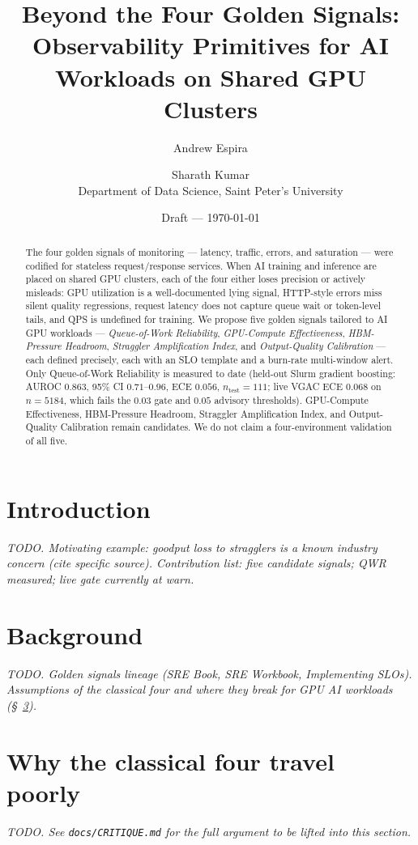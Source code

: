 \documentclass[11pt]{article}
\title{Beyond the Four Golden Signals:\\
Observability Primitives for AI Workloads on Shared GPU Clusters}
\author{Andrew Espira \and Sharath Kumar\\
Department of Data Science, Saint Peter's University}
\date{Draft --- \today}
\begin{document}
\maketitle

\begin{abstract}
The four golden signals of monitoring --- latency, traffic, errors, and
saturation --- were codified for stateless request/response services.
When AI training and inference are placed on shared GPU clusters, each of
the four either loses precision or actively misleads: GPU utilization is a
well-documented lying signal, HTTP-style errors miss silent quality
regressions, request latency does not capture queue wait or token-level
tails, and QPS is undefined for training. We propose five golden signals
tailored to AI GPU workloads --- \emph{Queue-of-Work Reliability},
\emph{GPU-Compute Effectiveness}, \emph{HBM-Pressure Headroom},
\emph{Straggler Amplification Index}, and \emph{Output-Quality
Calibration} --- each defined precisely, each with an SLO template and a
burn-rate multi-window alert. Only Queue-of-Work Reliability is measured
to date (held-out Slurm gradient boosting: AUROC $0.863$, 95\% CI
$0.71$--$0.96$, ECE $0.056$, $n_{\text{test}}=111$; live VGAC ECE
$0.068$ on $n=5184$, which fails the $0.03$ gate and $0.05$ advisory
thresholds). GPU-Compute Effectiveness, HBM-Pressure Headroom, Straggler
Amplification Index, and Output-Quality Calibration remain candidates.
We do not claim a four-environment validation of all five.
\end{abstract}

\section{Introduction}\label{sec:intro}
\emph{TODO. Motivating example: goodput loss to stragglers is a known
industry concern (cite specific source). Contribution list:
five candidate signals; QWR measured; live gate currently at warn.}

\section{Background}\label{sec:bg}
\emph{TODO. Golden signals lineage (SRE Book, SRE Workbook, Implementing
SLOs). Assumptions of the classical four and where they break for GPU AI
workloads (\S~\ref{sec:critique}).}

\section{Why the classical four travel poorly}\label{sec:critique}
\emph{TODO. See \texttt{docs/CRITIQUE.md} for the full argument to be
lifted into this section.}
\end{document}
